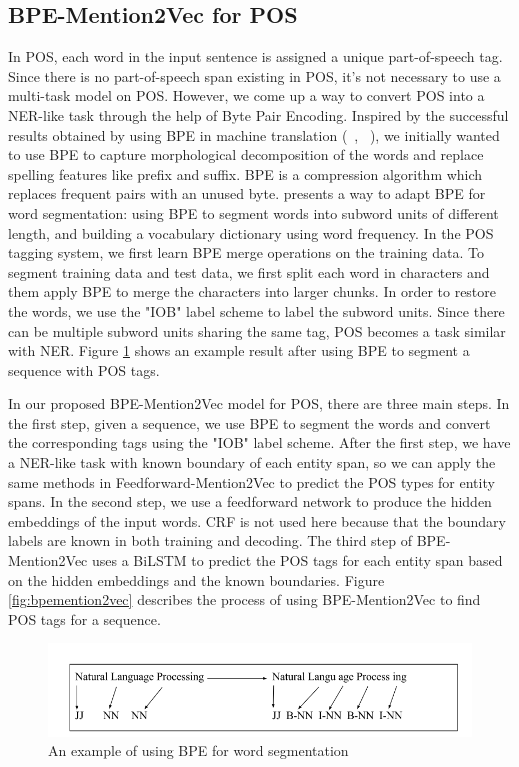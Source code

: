 \subsection{BPE-Mention2Vec for POS}
In POS, each word in the input sentence is assigned a unique part-of-speech tag. Since there is no part-of-speech span existing in POS, it's not necessary to use a multi-task model on POS. However, we come up a way to convert POS into a NER-like task through the help of Byte Pair Encoding. Inspired by the successful results obtained by using BPE in machine translation (~\citeauthor{sennrich2015neural}, ~\citeyear{sennrich2015neural}), we initially wanted to use BPE to capture morphological decomposition of the words and replace spelling features like prefix and suffix. BPE is a compression algorithm which replaces frequent pairs with an unused byte. \cite{sennrich2015neural} presents a way to adapt BPE for word segmentation: using BPE to segment words into subword units of different length, and building a vocabulary dictionary using word frequency. In the POS tagging system, we first learn BPE merge operations on the training data. To segment training data and test data, we first split each word in characters and them apply BPE to merge the characters into larger chunks. In order to restore the words, we use the "IOB" label scheme to label the subword units. Since there can be multiple subword units sharing the same tag, POS becomes a task similar with NER. Figure \ref{fig:bpe} shows an example result after using BPE to segment a sequence with POS tags. 

In our proposed BPE-Mention2Vec model for POS, there are three main steps. In the first step, given a sequence, we use BPE to segment the words and convert the corresponding tags using the "IOB" label scheme. After the first step, we have a NER-like task with known boundary of each entity span, so we can apply the same methods in Feedforward-Mention2Vec to predict the POS types for entity spans. In the second step, we use a feedforward network to produce the hidden embeddings of the input words. CRF is not used here because that the boundary labels are known in both training and decoding. The third step of BPE-Mention2Vec uses a BiLSTM to predict the POS tags for each entity span based on the hidden embeddings and the known boundaries. Figure \ref{fig:bpemention2vec} describes the process of using BPE-Mention2Vec to find POS tags for a sequence. 


\begin{figure}
  \centering
  \includegraphics[scale=0.5]{bpe.png}
 \caption{An example of using BPE for word segmentation}
  \label{fig:bpe}
\end{figure}

